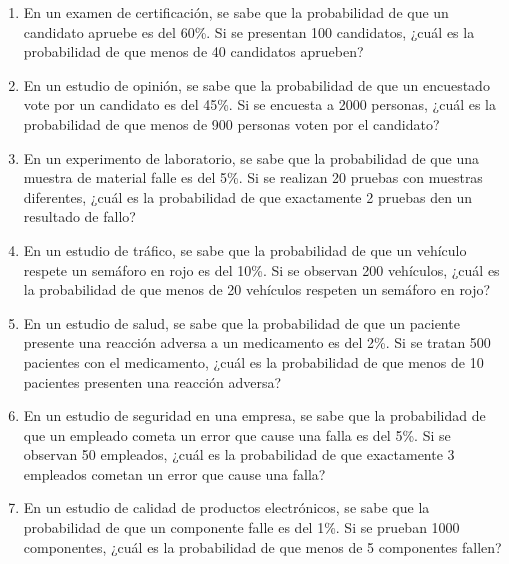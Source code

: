 \begin{Ejer}
\begin{enumerate}
    \item En un examen de certificación, se sabe que la probabilidad de que un candidato apruebe es del 60\%. Si se presentan 100 candidatos, ¿cuál es la probabilidad de que menos de 40 candidatos aprueben?

    \item En un estudio de opinión, se sabe que la probabilidad de que un encuestado vote por un candidato es del 45\%. Si se encuesta a 2000 personas, ¿cuál es la probabilidad de que menos de 900 personas voten por el candidato?

    \item En un experimento de laboratorio, se sabe que la probabilidad de que una muestra de material falle es del 5\%. Si se realizan 20 pruebas con muestras diferentes, ¿cuál es la probabilidad de que exactamente 2 pruebas den un resultado de fallo?

    \item En un estudio de tráfico, se sabe que la probabilidad de que un vehículo respete un semáforo en rojo es del 10\%. Si se observan 200 vehículos, ¿cuál es la probabilidad de que menos de 20 vehículos respeten un semáforo en rojo?

    \item En un estudio de salud, se sabe que la probabilidad de que un paciente presente una reacción adversa a un medicamento es del 2\%. Si se tratan 500 pacientes con el medicamento, ¿cuál es la probabilidad de que menos de 10 pacientes presenten una reacción adversa?

    \item En un estudio de seguridad en una empresa, se sabe que la probabilidad de que un empleado cometa un error que cause una falla es del 5\%. Si se observan 50 empleados, ¿cuál es la probabilidad de que exactamente 3 empleados cometan un error que cause una falla?

    \item En un estudio de calidad de productos electrónicos, se sabe que la probabilidad de que un componente falle es del 1\%. Si se prueban 1000 componentes, ¿cuál es la probabilidad de que menos de 5 componentes fallen?

\end{enumerate}
\end{Ejer} 


